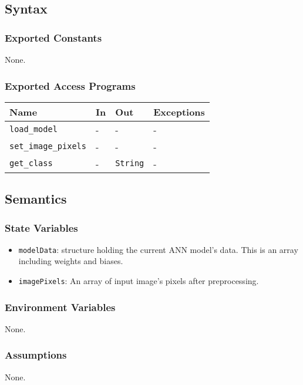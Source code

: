 \documentclass[12pt, titlepage]{article}
\def\code#1{\texttt{#1}}
\begin{document}
\subsection{Syntax}

\subsubsection{Exported Constants}
None.

\subsubsection{Exported Access Programs}

\begin{center}
\begin{tabular}{p{3cm} p{4cm} p{4cm} p{2cm}}
\hline
\textbf{Name} & \textbf{In} & \textbf{Out} & \textbf{Exceptions} \\
\hline
\code{load\_model} & - & - & - \\
\code{set\_image\_pixels} & - & - & - \\
\code{get\_class} & - & \code{String} &  -\\
\hline
\end{tabular}
\end{center}

\subsection{Semantics}

\subsubsection{State Variables}
\begin{itemize}
  \item \code{modelData}: structure holding the current ANN model's data. 
  This is an array including weights and biases.
  \item \code{imagePixels}: An array of input image's pixels after preprocessing.
\end{itemize}

\subsubsection{Environment Variables}
None.

\subsubsection{Assumptions}
None.
\end{document}
